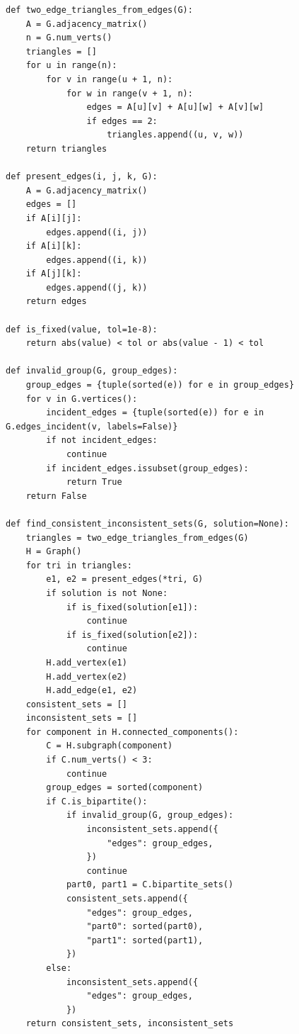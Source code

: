 \begin{lstlisting}[style=python, caption={Max Edge Enforcment Linear Program.}, label={lst::max_edge_enforcement_linear_program}]
def two_edge_triangles_from_edges(G):
    A = G.adjacency_matrix()
    n = G.num_verts()
    triangles = []
    for u in range(n):
        for v in range(u + 1, n):
            for w in range(v + 1, n):
                edges = A[u][v] + A[u][w] + A[v][w]
                if edges == 2:
                    triangles.append((u, v, w))
    return triangles

def present_edges(i, j, k, G):
    A = G.adjacency_matrix()
    edges = []
    if A[i][j]:
        edges.append((i, j))
    if A[i][k]:
        edges.append((i, k))
    if A[j][k]:
        edges.append((j, k))
    return edges

def is_fixed(value, tol=1e-8):
    return abs(value) < tol or abs(value - 1) < tol

def invalid_group(G, group_edges):
    group_edges = {tuple(sorted(e)) for e in group_edges}
    for v in G.vertices():
        incident_edges = {tuple(sorted(e)) for e in G.edges_incident(v, labels=False)}
        if not incident_edges:
            continue
        if incident_edges.issubset(group_edges):
            return True
    return False

def find_consistent_inconsistent_sets(G, solution=None):
    triangles = two_edge_triangles_from_edges(G)
    H = Graph()
    for tri in triangles:
        e1, e2 = present_edges(*tri, G)
        if solution is not None:
            if is_fixed(solution[e1]):
                continue
            if is_fixed(solution[e2]):
                continue
        H.add_vertex(e1)
        H.add_vertex(e2)
        H.add_edge(e1, e2)
    consistent_sets = []
    inconsistent_sets = []
    for component in H.connected_components():
        C = H.subgraph(component)
        if C.num_verts() < 3:
            continue
        group_edges = sorted(component)
        if C.is_bipartite():
            if invalid_group(G, group_edges):
                inconsistent_sets.append({
                    "edges": group_edges,
                })
                continue
            part0, part1 = C.bipartite_sets()
            consistent_sets.append({
                "edges": group_edges,
                "part0": sorted(part0),
                "part1": sorted(part1),
            })
        else:
            inconsistent_sets.append({
                "edges": group_edges,
            })
    return consistent_sets, inconsistent_sets


\end{lstlisting}
